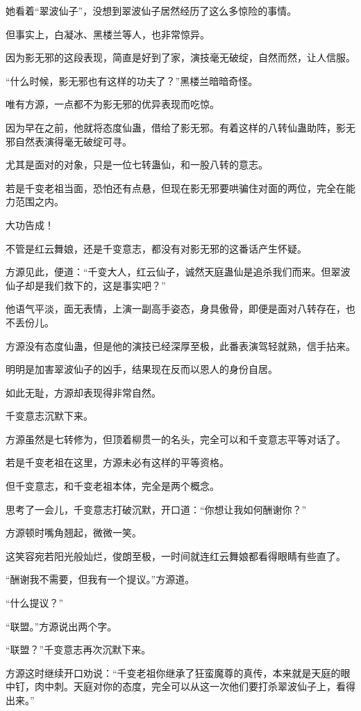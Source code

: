 \begin{this_body}
她看着“翠波仙子”，没想到翠波仙子居然经历了这么多惊险的事情。

但事实上，白凝冰、黑楼兰等人，也非常惊异。

因为影无邪的这段表现，简直是好到了家，演技毫无破绽，自然而然，让人信服。

“什么时候，影无邪也有这样的功夫了？”黑楼兰暗暗奇怪。

唯有方源，一点都不为影无邪的优异表现而吃惊。

因为早在之前，他就将态度仙蛊，借给了影无邪。有着这样的八转仙蛊助阵，影无邪自然表演得毫无破绽可寻。

尤其是面对的对象，只是一位七转蛊仙，和一股八转的意志。

若是千变老祖当面，恐怕还有点悬，但现在影无邪要哄骗住对面的两位，完全在能力范围之内。

大功告成！

不管是红云舞娘，还是千变意志，都没有对影无邪的这番话产生怀疑。

方源见此，便道：“千变大人，红云仙子，诚然天庭蛊仙是追杀我们而来。但翠波仙子却是我们救下的，这是事实吧？”

他语气平淡，面无表情，上演一副高手姿态，身具傲骨，即便是面对八转存在，也不丢份儿。

方源没有态度仙蛊，但是他的演技已经深厚至极，此番表演驾轻就熟，信手拈来。

明明是加害翠波仙子的凶手，结果现在反而以恩人的身份自居。

如此无耻，方源却表现得非常自然。

千变意志沉默下来。

方源虽然是七转修为，但顶着柳贯一的名头，完全可以和千变意志平等对话了。

若是千变老祖在这里，方源未必有这样的平等资格。

但千变意志，和千变老祖本体，完全是两个概念。

思考了一会儿，千变意志打破沉默，开口道：“你想让我如何酬谢你？”

方源顿时嘴角翘起，微微一笑。

这笑容宛若阳光般灿烂，俊朗至极，一时间就连红云舞娘都看得眼睛有些直了。

“酬谢我不需要，但我有一个提议。”方源道。

“什么提议？”

“联盟。”方源说出两个字。

“联盟？”千变意志再次沉默下来。

方源这时继续开口劝说：“千变老祖你继承了狂蛮魔尊的真传，本来就是天庭的眼中钉，肉中刺。天庭对你的态度，完全可以从这一次他们要打杀翠波仙子上，看得出来。”


\end{this_body}
